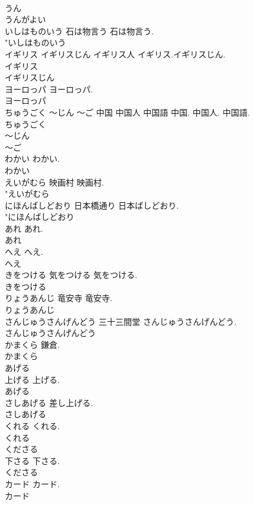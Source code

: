 \documentclass[8pt]{extreport}
\begin{document}
\begin{CJK}{UTF8}{min}
\\	うん
\\	うんがよい
\\	いしはものいう	石は物言う	石は物言う.	
\\	"いしはものいう
\\	イギリス イギリスじん	イギリス人	イギリス.イギリスじん.	
\\	イギリス
\\	イギリスじん
\\	ヨーロっパ		ヨーロっパ.	
\\	ヨーロっパ
\\	ちゅうごく ～じん ～ご	中国 中国人 中国語	中国. 中国人. 中国語.	
\\	ちゅうごく
\\	～じん
\\	～ご
\\	わかい		わかい.	
\\	わかい
\\	えいがむら	映画村	映画村.	
\\	"えいがむら
\\	にほんばしどおり	日本橋通り	日本ばしどおり.	
\\	"にほんばしどおり
\\	あれ		あれ.	
\\	あれ
\\	へえ		へえ.	
\\	へえ
\\	きをつける	気をつける	気をつける.	
\\	きをつける
\\	りょうあんじ	竜安寺	竜安寺.	
\\	りょうあんじ
\\	さんじゅうさんげんどう	三十三間堂	さんじゅうさんげんどう.	
\\	さんじゅうさんげんどう
\\	かまくら		鎌倉.	
\\	かまくら
\\	あげる	
\\	上げる	上げる.	
\\	あげる
\\	さしあげる		差し上げる.	
\\	さしあげる
\\	くれる		くれる.	
\\	くれる
\\	くださる	
\\	下さる	下さる.	
\\	くださる
\\	カード		カード.	
\\	カード

\end{CJK}
\end{document}

